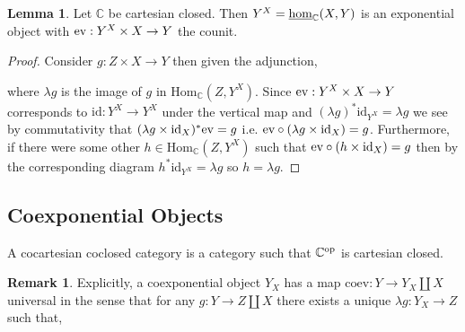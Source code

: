 \documentclass[12pt]{extarticle}
\newcommand{\Hom}[3]{\mathrm{Hom}_{#1}\left( #2, #3 \right)}
\newcommand{\id}{\mathrm{id}}
\theoremstyle{definition}
\newtheorem{lemma}[theorem]{Lemma}
\newtheorem{remark}{Remark}
\newenvironment{definition}[1][Definition:]{\begin{trivlist}
\item[\hskip \labelsep {\bfseries #1}]}{\end{trivlist}}
\newcommand{\C}{\mathbb{C}}
\begin{document}
\begin{lemma}
Let $\C$ be cartesian closed. Then $Y^X = \inthom{\C}{X}{Y}$ is an exponential object with $\mathrm{ev} : Y^X \times X \to Y$ the counit.
\end{lemma}

\begin{proof}
Consider $g : Z \times X \to Y$ then given the adjunction,
\begin{center}
\end{center}
where $\lambda g$ is the image of $g$ in $\Hom{\C}{Z}{Y^X}$. Since $\mathrm{ev} : Y^X \times X \to Y$ corresponds to $\id : Y^X \to Y^X$ under the vertical map and $(\lambda g)^* \id_{Y^X} = \lambda g$ we see by commutativity that $(\lambda g \times \id_X)^* \ev = g$ i.e. $\ev \circ (\lambda g \times \id_X) = g$. Furthermore, if there were some other $h \in \Hom{\C}{Z}{Y^X}$ such that $\ev \circ (h \times \id_X) = g$ then by the corresponding diagram $h^* \id_{Y^X} = \lambda g$ so $h = \lambda g$.
\end{proof}

\subsection{Coexponential Objects}

\begin{definition}
A cocartesian coclosed category is a category such that $\C^\op$ is cartesian closed.
\end{definition}

\newcommand{\coev}{\mathrm{coev}}

\begin{remark}
Explicitly, a coexponential object $Y_X$ has a map $\coev : Y \to Y_X \coprod X$ universal in the sense that for any $g : Y \to Z \coprod X$ there exists a unique $\lambda g : Y_X \to Z$ such that,
\begin{center}
\end{center}
\end{remark}
\end{document}
